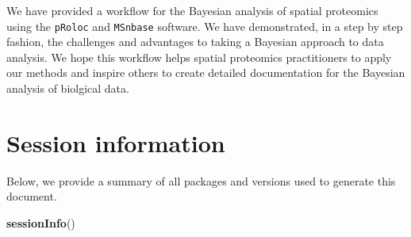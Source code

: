 \documentclass[]{article}
\newenvironment{Shaded}{\begin{snugshade}}{\end{snugshade}}
\newcommand{\KeywordTok}[1]{\textcolor[rgb]{0.13,0.29,0.53}{\textbf{{#1}}}}
\newcommand{\NormalTok}[1]{{#1}}
\begin{document}
We have provided a workflow for the Bayesian analysis of spatial
proteomics using the \texttt{pRoloc} and \texttt{MSnbase} software. We
have demonstrated, in a step by step fashion, the challenges and
advantages to taking a Bayesian approach to data analysis. We hope this
workflow helps spatial proteomics practitioners to apply our methods and
inspire others to create detailed documentation for the Bayesian
analysis of biolgical data.

\section{Session information}\label{session-information}

Below, we provide a summary of all packages and versions used to
generate this document.

\begin{Shaded}
\begin{Highlighting}[]
\KeywordTok{sessionInfo}\NormalTok{()}
\end{Highlighting}
\end{Shaded}
\end{document}
